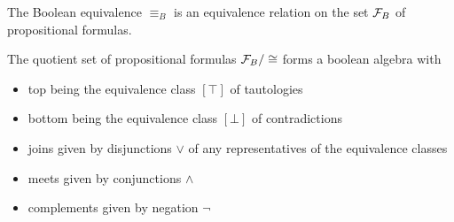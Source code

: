 \begin{proposition}\label{thm:boolean_equivalence_relation}
  The Boolean equivalence $\equiv_B$ is an equivalence relation on the set $\mathcal F_B$ of propositional formulas.
\end{proposition}

\begin{theorem}\label{thm:propositional_logic_boolean_algebra}
  The quotient set of propositional formulas $\mathcal F_B / \cong$ forms a boolean algebra with
  \begin{itemize}
    \item top being the equivalence class $[\top]$ of tautologies
    \item bottom being the equivalence class $[\bot]$ of contradictions
    \item joins given by disjunctions $\lor$ of any representatives of the equivalence classes
    \item meets given by conjunctions $\land$
    \item complements given by negation $\neg$
  \end{itemize}
\end{theorem}
